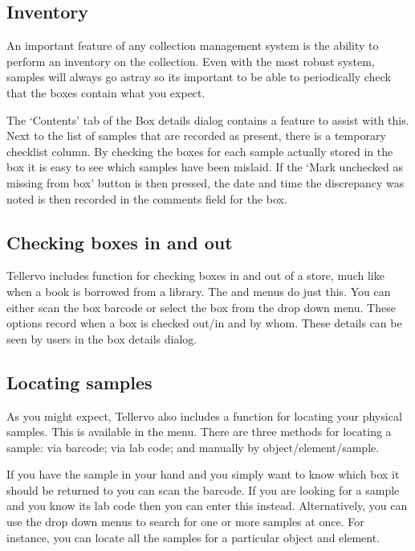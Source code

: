 \subsection{Inventory}
An important feature of any collection management system is the ability to perform an inventory on the collection.  Even with the most robust system, samples will always go astray so its important to be able to periodically check that the boxes contain what you expect.

The `Contents' tab of the Box details dialog contains a feature to assist with this.  Next to the list of samples that are recorded as present, there is a temporary checklist column.  By checking the boxes for each sample actually stored in the box it is easy to see which samples have been mislaid.  If the `Mark unchecked as missing from box' button is then pressed, the date and time the discrepancy was noted is then recorded in the comments field for the box.

\subsection{Checking boxes in and out}
Tellervo includes function for checking boxes in and out of a store, much like when a book is borrowed from a library.  The  and  menus do just this.  You can either scan the box barcode or select the box from the drop down menu.  These options record when a box is checked out/in and by whom.  These details can be seen by users in the box details dialog.

\subsection{Locating samples}
As you might expect, Tellervo also includes a function for locating your physical samples.  This is available in the  menu.  There are three methods for locating a sample: via barcode; via lab code; and manually by object/element/sample.  

If you have the sample in your hand and you simply want to know which box it should be returned to you can scan the barcode.  If you are looking for a sample and you know its lab code then you can enter this instead.  Alternatively, you can use the drop down menus to search for one or more samples at once.  For instance, you can locate all the samples for a particular object and element.



